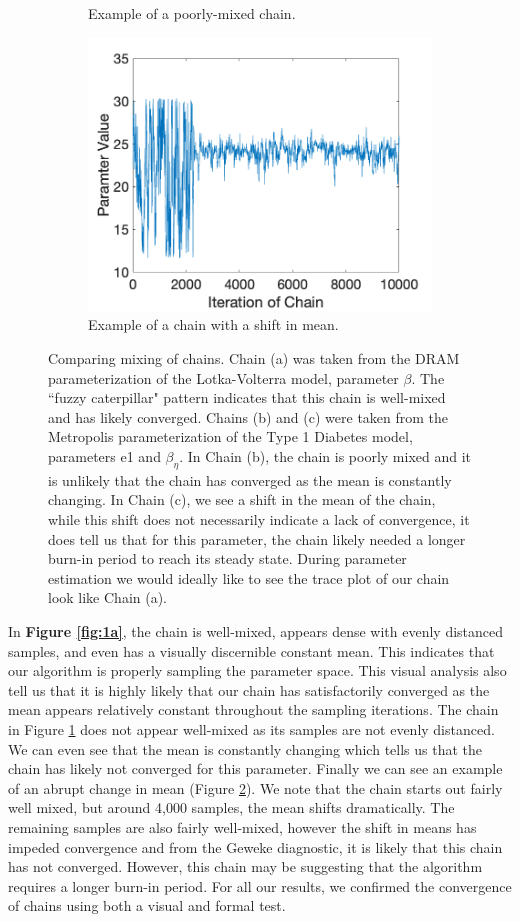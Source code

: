 \begin{figure}[H]
\begin{subfigure}{.5\textwidth}
  \caption{Example of a poorly-mixed chain.}
  \label{fig:1b}
\end{subfigure}
\centering
\begin{subfigure}{.5\textwidth}
  \includegraphics[width=.8\linewidth]{MCMC_figs/chain_mix_ex3.png}
  \caption{Example of a chain with a shift in mean.}
  \label{fig:1c}
\end{subfigure}
\caption{Comparing mixing of chains. Chain (a) was taken from the DRAM parameterization of the Lotka-Volterra model, parameter $\beta$. The ``fuzzy caterpillar" pattern indicates that this chain is well-mixed and has likely converged. Chains (b) and (c) were taken from the Metropolis parameterization of the Type 1 Diabetes model, parameters e1 and $\beta_\eta$. In Chain (b), the chain is poorly mixed and it is unlikely that the chain has converged as the mean is constantly changing. In Chain (c), we see a shift in the mean of the chain, while this shift does not necessarily indicate a lack of convergence, it does tell us that for this parameter, the chain likely needed a longer burn-in period to reach its steady state. During parameter estimation we would ideally like to see the trace plot of our chain look like Chain (a).}
\label{fig:1disc}
\end{figure}
In \textbf{Figure \ref{fig:1a}}, the chain is well-mixed, appears dense with evenly distanced samples, and even has a visually discernible constant mean. This indicates that our algorithm is properly sampling the parameter space. This visual analysis also tell us that it is highly likely that our chain has satisfactorily converged as the mean appears relatively constant throughout the sampling iterations. The chain in Figure \ref{fig:1b} does not appear well-mixed as its samples are not evenly distanced. We can even see that the mean is constantly changing which tells us that the chain has likely not converged for this parameter. Finally we can see an example of an abrupt change in mean (Figure \ref{fig:1c}). We note that the chain starts out fairly well mixed, but around 4,000 samples, the mean shifts dramatically. The remaining samples are also fairly well-mixed, however the shift in means has impeded convergence and from the Geweke diagnostic, it is likely that this chain has not converged. However, this chain may be suggesting that the algorithm requires a longer burn-in period. For all our results, we confirmed the convergence of chains using both a visual and formal test.

